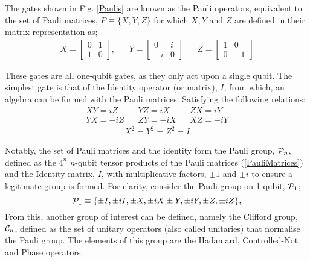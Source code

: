 The gates shown in Fig. \ref{Paulis} are known as the Pauli operators, equivalent
to the set of Pauli matrices, $P \equiv \{X, Y, Z\}$ for which $X, Y \text{ and } Z$ are defined in their matrix representation as;
\begin{align}
    \label{PauliMatrices}
    X = \begin{bmatrix}
            0 & 1 \\
            1 & 0
        \end{bmatrix},
     &  &
    Y = \begin{bmatrix}
            0  & i \\
            -i & 0
        \end{bmatrix}
     &  &
    Z = \begin{bmatrix}
            1 & 0  \\
            0 & -1
        \end{bmatrix}
\end{align}

These gates are all one-qubit gates, as they only act upon a single qubit.
The simplest gate is that of the Identity operator (or matrix), $I$, from which, an algebra
can be formed with the Pauli matrices. Satisfying the following relations:
\begin{align}
    XY = iZ  &  & YZ = iX  &  & ZX = iY  \\
    YX = -iZ &  & ZY = -iX &  & XZ = -iY
\end{align}
\begin{align}
    X^2 = Y^2 = Z^2 = I
\end{align}

Notably, the set of Pauli matrices and the identity form
the Pauli group, ${\cal P}_n$, defined as the $4^n$ $n$-qubit tensor products of the Pauli matrices (\ref{PauliMatrices}) and the
Identity matrix, $I$, with multiplicative factors, $\pm 1$ and $\pm i$ to ensure a legitimate group is formed.
For clarity, consider the Pauli group on 1-qubit, ${\cal P}_1$;
\begin{equation}
    {\cal P}_1 \equiv \{ \pm I, \pm iI, \pm X, \pm iX \pm Y, \pm iY, \pm Z, \pm iZ\},
\end{equation}
From this, another group of interest can be defined, namely the Clifford group, ${\cal C}_n$, defined as the
set of unitary operators (also called unitaries) that normalise the Pauli group. The elements of this group are the
Hadamard, Controlled-Not and Phase operators.

